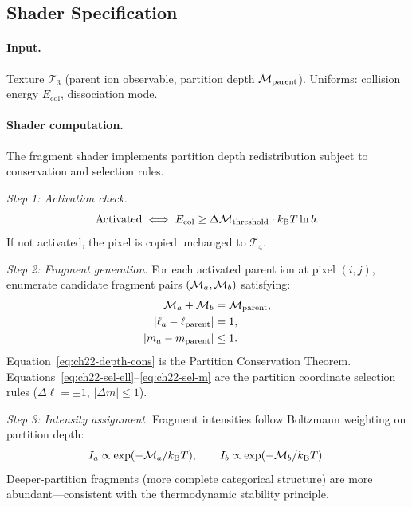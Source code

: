 \subsection{Shader Specification}

\paragraph{Input.}
Texture $\mathcal{T}_3$ (parent ion observable, partition depth
$\mathcal{M}_{\mathrm{parent}}$).  Uniforms: collision energy $E_{\mathrm{col}}$,
dissociation mode.

\paragraph{Shader computation.}

The fragment shader implements partition depth redistribution subject to
conservation and selection rules.

\textit{Step 1: Activation check.}
\begin{equation}
  \mathrm{Activated} \iff E_{\mathrm{col}} \geq \Delta\mathcal{M}_{\mathrm{threshold}} \cdot k_{\mathrm{B}} T\ln b.
\end{equation}
If not activated, the pixel is copied unchanged to $\mathcal{T}_4$.

\textit{Step 2: Fragment generation.}
For each activated parent ion at pixel $(i,j)$, enumerate candidate
fragment pairs $(\mathcal{M}_a, \mathcal{M}_b)$ satisfying:
\begin{align}
  \mathcal{M}_a + \mathcal{M}_b &= \mathcal{M}_{\mathrm{parent}}, \label{eq:ch22-depth-cons}\\
  |\ell_a - \ell_{\mathrm{parent}}| &= 1, \label{eq:ch22-sel-ell}\\
  |m_a - m_{\mathrm{parent}}| &\leq 1. \label{eq:ch22-sel-m}
\end{align}
Equation~\eqref{eq:ch22-depth-cons} is the Partition Conservation Theorem.
Equations~\eqref{eq:ch22-sel-ell}--\eqref{eq:ch22-sel-m} are the partition
coordinate selection rules ($\Delta\ell = \pm 1$, $|\Delta m|\leq 1$).

\textit{Step 3: Intensity assignment.}
Fragment intensities follow Boltzmann weighting on partition depth:
\begin{equation}
  I_a \propto \exp(-\mathcal{M}_a/k_{\mathrm{B}} T), \qquad
  I_b \propto \exp(-\mathcal{M}_b/k_{\mathrm{B}} T).
\end{equation}
Deeper-partition fragments (more complete categorical structure) are more
abundant---consistent with the thermodynamic stability principle.

